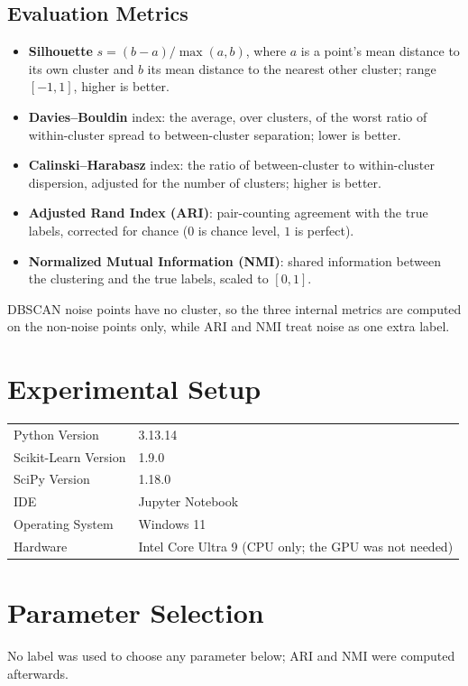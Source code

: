 \documentclass[12pt,a4paper]{article}
\begin{document}
\subsection*{Evaluation Metrics}
\begin{itemize}
\item \textbf{Silhouette} $s = (b - a)/\max(a, b)$, where $a$ is a point's mean distance to its
own cluster and $b$ its mean distance to the nearest other cluster; range $[-1, 1]$, higher is
better.
\item \textbf{Davies--Bouldin} index: the average, over clusters, of the worst ratio of
within-cluster spread to between-cluster separation; lower is better.
\item \textbf{Calinski--Harabasz} index: the ratio of between-cluster to within-cluster
dispersion, adjusted for the number of clusters; higher is better.
\item \textbf{Adjusted Rand Index (ARI)}: pair-counting agreement with the true labels, corrected
for chance ($0$ is chance level, $1$ is perfect).
\item \textbf{Normalized Mutual Information (NMI)}: shared information between the clustering
and the true labels, scaled to $[0, 1]$.
\end{itemize}
DBSCAN noise points have no cluster, so the three internal metrics are computed on the non-noise
points only, while ARI and NMI treat noise as one extra label.

\section{Experimental Setup}
\begin{tabular}{ll}
\toprule
Python Version & 3.13.14 \\
Scikit-Learn Version & 1.9.0 \\
SciPy Version & 1.18.0 \\
IDE & Jupyter Notebook \\
Operating System & Windows 11 \\
Hardware & Intel Core Ultra 9 (CPU only; the GPU was not needed) \\
\bottomrule
\end{tabular}

\section{Parameter Selection}
No label was used to choose any parameter below; ARI and NMI were computed afterwards.
\end{document}
